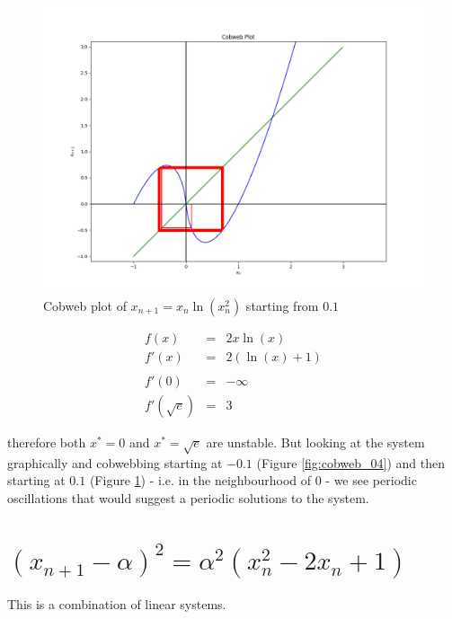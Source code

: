 \documentclass{report}
\begin{document}
\begin{figure}[h]
	\centering
	\includegraphics[scale = 0.4]{cobweb_05}
	\caption{Cobweb plot of $x_{n + 1} = x_n \ln(x_n^2)$ starting from $0.1$}
	\label{fig:cobweb_05}
\end{figure}\medskip

\begin{eqnarray*}
           f(x) & = & 2 x \ln(x) \\
          f'(x) & = & 2 (\ln(x) + 1) \\\\
          f'(0) & = & -\infty \\
   f'(\sqrt{e}) & = & 3
\end{eqnarray*}\medskip



therefore both $x^* = 0$ and $x^* = \sqrt{e}$ are unstable. But looking at the system
graphically and cobwebbing starting at $-0.1$ (Figure \ref{fig:cobweb_04}) and then
starting at $0.1$ (Figure \ref{fig:cobweb_05}) - i.e. in the neighbourhood of $0$ - we
see periodic oscillations that would suggest a periodic solutions to the system. \bigskip









\section{$(x_{n + 1} - \alpha)^2 = \alpha^2 (x_n^2 -2 x_n + 1)$}

This is a combination of linear systems. \bigskip
\end{document}
